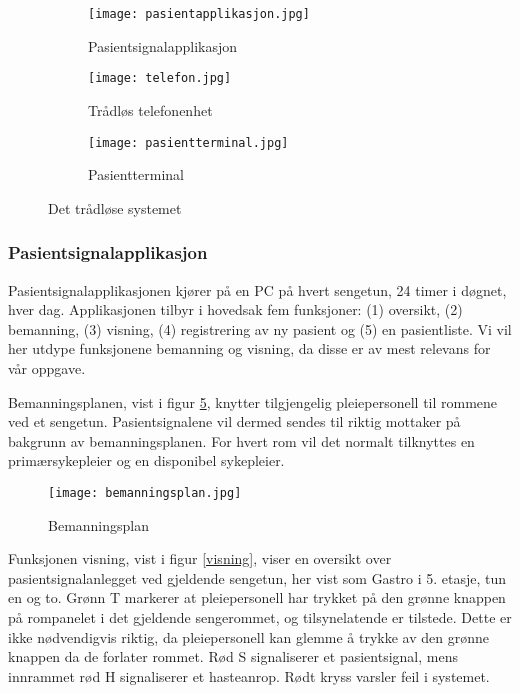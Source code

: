 \begin{figure}[H]
        \centering
        \begin{subfigure}[b]{0.35\textwidth}
        		\centering
                \texttt{[image: pasientapplikasjon.jpg]}
                \caption{Pasientsignalapplikasjon}
                \label{pasientapplikasjon}
        \end{subfigure}
        \begin{subfigure}[b]{0.35\textwidth}
        		\centering
                \texttt{[image: telefon.jpg]}
                \caption{Trådløs telefonenhet}
                \label{telefonenhet}
        \end{subfigure}
        \begin{subfigure}[b]{0.25\textwidth}
        		\centering
                \texttt{[image: pasientterminal.jpg]}
                \caption{Pasientterminal}
                \label{pasientterminal}
        \end{subfigure}
        \caption{Det trådløse systemet}\label{dettradlosesystemet}
\end{figure}

\subsubsection{Pasientsignalapplikasjon}
Pasientsignalapplikasjonen kjører på en PC på hvert sengetun, 24 timer i døgnet, hver dag. Applikasjonen tilbyr i hovedsak fem funksjoner: (1) oversikt, (2) bemanning, (3) visning, (4) registrering av ny pasient og (5) en pasientliste. Vi vil her utdype funksjonene bemanning og visning, da disse er av mest relevans for vår oppgave.  

\noindent
Bemanningsplanen, vist i figur \ref{bemanningsplan}, knytter tilgjengelig pleiepersonell til rommene ved et sengetun. Pasientsignalene vil dermed sendes til riktig mottaker på bakgrunn av bemanningsplanen. For hvert rom vil det normalt tilknyttes en primærsykepleier og en disponibel sykepleier.

\begin{figure}[H]
\centering
\texttt{[image: bemanningsplan.jpg]}
\caption{Bemanningsplan}
\label{bemanningsplan}
\end{figure}

\noindent
Funksjonen visning, vist i figur \ref{visning}, viser en oversikt over pasientsignalanlegget ved gjeldende sengetun, her vist som Gastro i 5. etasje, tun en og to. Grønn T markerer at pleiepersonell har trykket på den grønne knappen på rompanelet i det gjeldende sengerommet, og tilsynelatende er tilstede. Dette er ikke nødvendigvis riktig, da pleiepersonell kan glemme å trykke av den grønne knappen da de forlater rommet. Rød S signaliserer et pasientsignal, mens innrammet rød H signaliserer et hasteanrop. Rødt kryss varsler feil i systemet.

